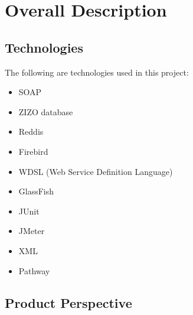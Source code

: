 \documentclass[a4paper,10pt]{article}
\begin{document}
	\newpage

\section{Overall Description}

\subsection{Technologies}{
	The following are technologies used in this project:
	\begin{itemize}
		\item SOAP
		\item ZIZO database
		\item Reddis
		\item Firebird
		\item WDSL (Web Service Definition Language)
		\item GlassFish
		\item JUnit
		\item JMeter
		\item XML
		\item Pathway
	\end{itemize}
}
	
\subsection{Product Perspective}
\end{document}
